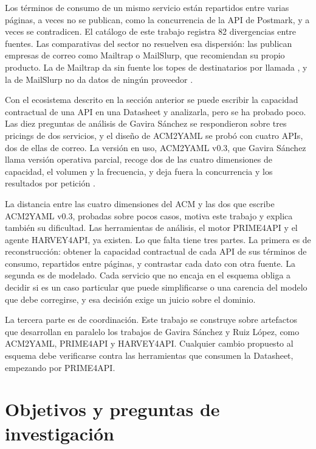 Los términos de consumo de un mismo servicio están repartidos entre varias
páginas, a veces no se publican, como la concurrencia de la API de Postmark,
y a veces se contradicen. El catálogo de este trabajo registra 82
divergencias entre fuentes. Las comparativas del sector no resuelven esa
dispersión: las publican empresas de correo como Mailtrap o MailSlurp, que
recomiendan su propio producto. La de Mailtrap da sin fuente los topes de destinatarios por
llamada \citep{mailtrap2026comparativa}, y la de MailSlurp no da datos de
ningún proveedor \citep{mailslurp2026comparativa}.

Con el ecosistema descrito en la sección anterior se puede escribir la
capacidad contractual de una API en una Datasheet y analizarla, pero se ha
probado poco. Las diez preguntas de análisis de Gavira Sánchez se
respondieron sobre tres pricings de dos servicios, y el diseño de ACM2YAML se
probó con cuatro APIs, dos de ellas de correo. La versión en uso, ACM2YAML
v0.3, que Gavira Sánchez llama versión operativa parcial, recoge dos de las
cuatro dimensiones de capacidad, el volumen y la frecuencia, y deja fuera la
concurrencia y los resultados por petición \citep{gavira2026tfm}.

La distancia entre las cuatro dimensiones del ACM y las dos que escribe
ACM2YAML v0.3, probadas sobre pocos casos, motiva este trabajo y explica
también su dificultad. Las herramientas de análisis, el motor PRIME4API y el
agente HARVEY4API, ya existen. Lo que falta tiene tres partes. La primera es
de reconstrucción: obtener la capacidad contractual de cada API de sus
términos de consumo, repartidos entre páginas, y contrastar cada dato con otra
fuente. La segunda es de modelado. Cada servicio que no encaja en el esquema obliga a
decidir si es un caso particular que puede simplificarse o una carencia del
modelo que debe corregirse, y esa decisión exige un juicio sobre el dominio.

La tercera parte es de coordinación. Este trabajo se construye sobre
artefactos que desarrollan en paralelo los trabajos de Gavira Sánchez y Ruiz
López, como ACM2YAML, PRIME4API y HARVEY4API. Cualquier cambio propuesto al esquema debe
verificarse contra las herramientas que consumen la Datasheet, empezando por
PRIME4API.

\section{Objetivos y preguntas de investigación}
\label{sec:introduccion:objetivos}

